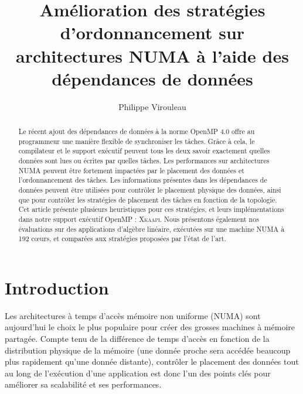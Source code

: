 \documentclass[parallelisme]{compas2016}
\begin{document}
\title{Amélioration des stratégies d'ordonnancement sur architectures NUMA à l'aide
des dépendances de données}

\author{Philippe Virouleau}
\address{Inria,\\
   Univ. Grenoble Alpes,  CNRS, Grenoble Institute of Technology, LIG, Grenoble, France\\
   philippe.virouleau@inria.fr\\
}
\date{}


\maketitle

\newcommand{\benchs}{KASTORS }
\newcommand{\kaapi}{\textsc{\mbox{Xkaapi}}\xspace}
\begin{abstract}
Le récent ajout des dépendances de données à la norme OpenMP 4.0 offre
au programmeur une manière flexible de synchroniser les tâches.
Grâce à cela, le compilateur et le support exécutif peuvent tous les deux savoir
exactement quelles données sont lues ou écrites par quelles tâches.
Les performances sur architectures NUMA peuvent être fortement impactées par
le placement des données et l'ordonnancement des tâches. Les informations présentes
dans les dépendances de données peuvent être utilisées pour contrôler le placement physique des données,
ainsi que pour contrôler les stratégies de placement des tâches en
fonction de la topologie.
Cet article présente plusieurs heuristiques pour ces stratégies, et leurs implémentations
dans notre support exécutif OpenMP : \kaapi.
Nous présentons également nos évaluations sur des applications d'algèbre linéaire,
exécutées sur une machine NUMA à 192 cœurs, et comparées aux stratégies proposées
par l'état de l'art.
\end{abstract}

	
\vspace*{-4ex}
\section{Introduction}

Les architectures à temps d'accès mémoire non uniforme (NUMA) sont
aujourd'hui le choix le plus populaire pour créer des grosses machines à mémoire
partagée.
Compte tenu de la différence de temps d'accès en fonction de la distribution physique
de la mémoire (une donnée proche sera accédée beaucoup plus rapidement qu'une donnée distante),
contrôler le placement des données tout au long de l'exécution d'une application
est donc l'un des points clés pour améliorer sa scalabilité et ses performances.
\end{document}
